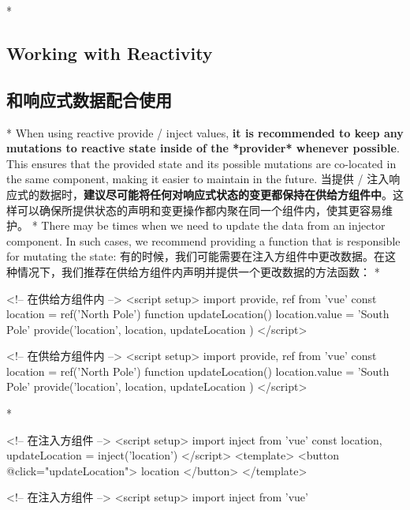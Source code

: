 \begin{paracol}{2}
 
\switchcolumn[0]*%
\subsection{Working with Reactivity}
\switchcolumn
\subsection{和响应式数据配合使用}
\switchcolumn[0]*%
When using reactive provide / inject values, \textbf{it is recommended
to keep any mutations to reactive state inside of the *provider*
whenever possible}. This ensures that the provided state and its
possible mutations are co-located in the same component, making it
easier to maintain in the future.
\switchcolumn
当提供 /
注入响应式的数据时，\textbf{建议尽可能将任何对响应式状态的变更都保持在供给方组件中}。这样可以确保所提供状态的声明和变更操作都内聚在同一个组件内，使其更容易维护。
\switchcolumn[0]*%
There may be times when we need to update the data from an injector
component. In such cases, we recommend providing a function that is
responsible for mutating the state:
\switchcolumn
有的时候，我们可能需要在注入方组件中更改数据。在这种情况下，我们推荐在供给方组件内声明并提供一个更改数据的方法函数：
\switchcolumn[0]*%
\begin{codeHtml}
<!-- 在供给方组件内 -->
<script setup>
import { provide, ref } from 'vue'
const location = ref('North Pole')
function updateLocation() {
  location.value = 'South Pole'
}
provide('location', {
  location,
  updateLocation
})
</script>
\end{codeHtml}
\switchcolumn
\begin{codeHtml}
<!-- 在供给方组件内 -->
<script setup>
import { provide, ref } from 'vue'
const location = ref('North Pole')
function updateLocation() {
  location.value = 'South Pole'
}
provide('location', {
  location,
  updateLocation
})
</script>
\end{codeHtml}
\switchcolumn[0]*%
\begin{codeHtml}
<!-- 在注入方组件 -->
<script setup>
import { inject } from 'vue'
const { location, updateLocation } = inject('location')
</script>
<template>
  <button @click="updateLocation">{{ location }}</button>
</template>
\end{codeHtml}
\switchcolumn
\begin{codeHtml}
<!-- 在注入方组件 -->
<script setup>
import { inject } from 'vue'

\end{codeHtml}
\end{paracol}
